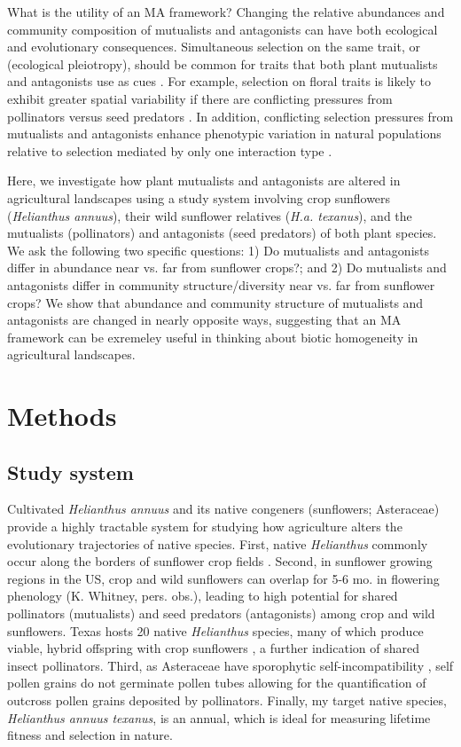 \documentclass[12pt]{article}
\begin{document}
What is the utility of an MA framework?  Changing the relative abundances and community composition of mutualists and antagonists can have both ecological and evolutionary consequences.  Simultaneous selection on the same trait, or (ecological pleiotropy), should be common for traits that both plant mutualists and antagonists use as cues \citep{Strauss2004}. For example, selection on floral traits is likely to exhibit greater spatial variability if there are conflicting pressures from pollinators versus seed predators \citep[e.g., ][]{Cariveau2004}. In addition, conflicting selection pressures from mutualists and antagonists enhance phenotypic variation in natural populations relative to selection mediated by only one interaction type \citep{Irwin2003,Siepielski2010}.

Here, we investigate how plant mutualists and antagonists are altered in agricultural landscapes using a study system involving crop sunflowers (\textit{Helianthus annuus}), their wild sunflower relatives (\textit{H.a. texanus}), and the mutualists (pollinators) and antagonists (seed predators) of both plant species.  We ask the following two specific questions: 1) Do mutualists and antagonists differ in abundance near vs. far from sunflower crops?; and 2) Do mutualists and antagonists differ in community structure/diversity near vs. far from sunflower crops?  We show that abundance and community structure of mutualists and antagonists are changed in nearly opposite ways, suggesting that an MA framework can be exremeley useful in thinking about biotic homogeneity in agricultural landscapes. 

\section{Methods}
\subsection{Study system}
Cultivated \textit{Helianthus annuus} and its native congeners (sunflowers; Asteraceae) provide a highly tractable system for studying how agriculture alters the evolutionary trajectories of native species.  First, native \textit{Helianthus} commonly occur along the borders of sunflower crop fields \citep{Burke2002}.  Second, in sunflower growing regions in the US, crop and wild sunflowers can overlap for 5-6 mo. in flowering phenology (K. Whitney, pers. obs.), leading to high potential for shared pollinators (mutualists) and seed predators (antagonists) among crop and wild sunflowers. Texas hosts 20 native \textit{Helianthus} species, many of which produce viable, hybrid offspring with crop sunflowers \citep{Whitton1997,Linder1998}, a further indication of shared insect pollinators. Third, as Asteraceae have sporophytic self-incompatibility \citep{Linder1998}, self pollen grains do not germinate pollen tubes allowing for the quantification of outcross pollen grains deposited by pollinators. Finally, my target native species, \textit{Helianthus annuus texanus}, is an annual, which is ideal for measuring lifetime fitness and selection in nature. 
\end{document}
